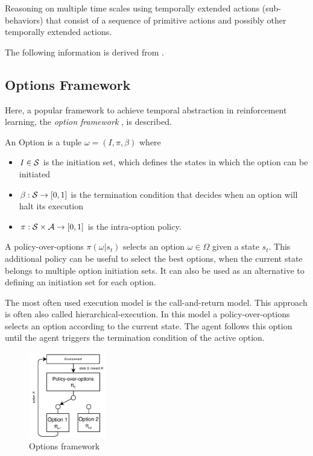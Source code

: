 Reasoning on multiple time scales using temporally extended actions (sub-behaviors) that consist of a sequence of primitive actions
and possibly other temporally extended actions.

The following information is derived from \cite{survey_mdpi}.

\subsection{Options Framework}
Here, a popular framework to achieve temporal abstraction in reinforcement learning, the \textit{option framework} \cite{Options}, is described.

\begin{definition}
    An Option is a tuple $\omega = (I, \pi, \beta)$ where
    \begin{itemize}
        \item $I \in \mathcal{S}$ is the initiation set, which defines the states in which the option can be initiated
        \item $\beta: \mathcal{S} \rightarrow [0, 1]$ is the termination condition that decides when an option will halt its execution
        \item $\pi: \mathcal{S} \times \mathcal{A} \rightarrow [0,1]$ is the intra-option policy.
    \end{itemize}
\end{definition}

A policy-over-options $\pi(\omega|s_t)$ selects an option $\omega \in \Omega$ given a state $s_t$. This additional policy can be useful
to select the best options, when the current state belongs to multiple option initiation sets. It can also be used as an alternative to defining
an initiation set for each option.

The most often used execution model is the call-and-return model. This approach is often also called hierarchical-execution.
In this model a policy-over-options selects an option according to the current state. The agent follows this option until the 
agent triggers the termination condition of the active option.

\begin{figure}[b]
    \centering
    \includegraphics[width=0.3\textwidth]{Images/options_framework.png}
    \caption{Options framework}
    \label{fig:options_framework}
\end{figure}

